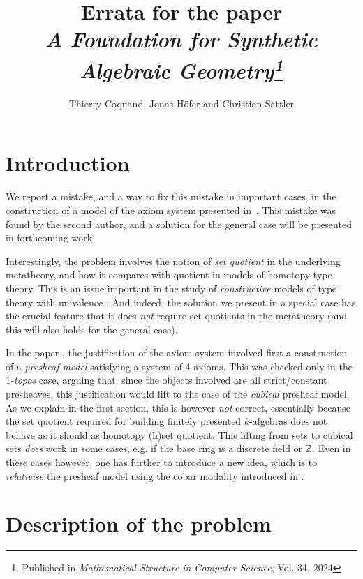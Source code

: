 \documentclass[10pt,a4paper]{article}
\theoremstyle{definition}
\theoremstyle{remark}
\newcommand{\ints}{\mathbb{Z}}
\begin{document}
\title{Errata for the paper\\ {\em A Foundation for Synthetic Algebraic Geometry\footnote{Published in {\em Mathematical Structure in Computer Science}, Vol. 34, 2024}}}

\author{Thierry Coquand, Jonas H\"ofer and Christian Sattler}
\date{}
\maketitle


\section*{Introduction}

We report a mistake, and a way to fix this mistake in important cases, in the construction of a model of the axiom system  presented in~\cite{draft}.
This mistake was found by the second author, and a solution for the general case will be presented in forthcoming work.

Interestingly, the problem involves the notion of {\em set quotient} in the underlying metatheory, and how it compares with quotient in models
of homotopy type theory. This is an issue important in the study of
{\em constructive} models of type theory with univalence \cite{shulman21}. And indeed, the solution we present in a special case has the crucial feature that it does {\em not} require set quotients in the metatheory (and this will also holds for the general case).

In the paper \cite{draft}, the justification of the axiom system involved first a construction of a {\em presheaf model} satisfying a system of
4 axioms. This was checked only in the {\em $1$-topos} case, arguing that, since the objects involved are all strict/constant presheaves, this justification would
lift to the case of the {\em cubical} presheaf model. As we explain in the first section, this is however {\em not} correct, essentially because the set
quotient required for building finitely presented $k$-algebras does not behave as it should as homotopy (h)set quotient. This lifting from sets to cubical sets
{\em does} work in some cases, e.g.
if the base ring is a discrete field \cite{mines} or $\ints$. Even in these cases however, one has further to introduce a new idea, which is to
{\em relativise} the presheaf model using the cobar modality introduced in \cite{CRS21}.

\section{Description of the problem}
\end{document}
